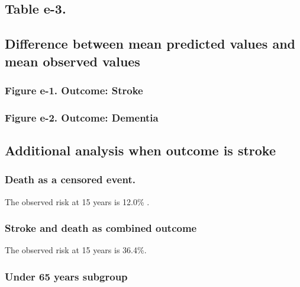 \documentclass[
]{book}
\begin{document}
\hypertarget{table-e-3.}{%
\subsection{Table e-3.}\label{table-e-3.}}

\hypertarget{difference-between-mean-predicted-values-and-mean-observed-values}{%
\subsection{Difference between mean predicted values and mean observed values}\label{difference-between-mean-predicted-values-and-mean-observed-values}}

\hypertarget{figure-e-1.-outcome-stroke}{%
\subsubsection{Figure e-1. Outcome: Stroke}\label{figure-e-1.-outcome-stroke}}

\hypertarget{figure-e-2.-outcome-dementia}{%
\subsubsection{Figure e-2. Outcome: Dementia}\label{figure-e-2.-outcome-dementia}}

\hypertarget{additional-analysis-when-outcome-is-stroke}{%
\subsection{Additional analysis when outcome is stroke}\label{additional-analysis-when-outcome-is-stroke}}

\hypertarget{death-as-a-censored-event.}{%
\subsubsection{Death as a censored event.}\label{death-as-a-censored-event.}}

The observed risk at 15 years is 12.0\% .

\hypertarget{stroke-and-death-as-combined-outcome}{%
\subsubsection{Stroke and death as combined outcome}\label{stroke-and-death-as-combined-outcome}}

The observed risk at 15 years is 36.4\%.

\hypertarget{under-65-years-subgroup}{%
\subsubsection{Under 65 years subgroup}\label{under-65-years-subgroup}}
\end{document}
